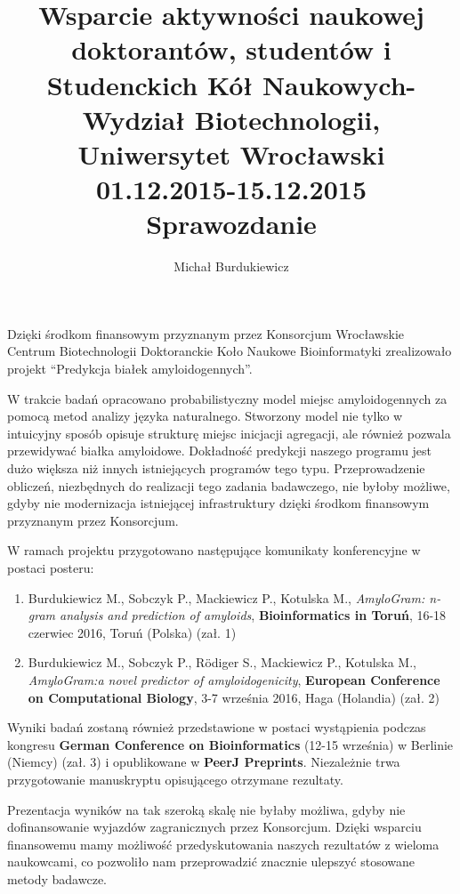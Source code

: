 \documentclass[12pt]{article}
\author{Michał Burdukiewicz}
\title{\large Wsparcie aktywności naukowej doktorantów, studentów i Studenckich 
Kół Naukowych- Wydział Biotechnologii, Uniwersytet Wrocławski 
\\ 
01.12.2015-15.12.2015 \\ 
\normalsize Sprawozdanie}
\date{}
\begin{document}
\maketitle

Dzięki środkom finansowym przyznanym przez Konsorcjum Wrocławskie Centrum 
Biotechnologii Doktoranckie Koło Naukowe Bioinformatyki  
zrealizowało projekt ``Predykcja białek amyloidogennych''.

W trakcie badań opracowano probabilistyczny model miejsc amyloidogennych za 
pomocą metod analizy języka naturalnego. Stworzony model nie tylko w 
intuicyjny sposób opisuje strukturę miejsc inicjacji agregacji, ale również 
pozwala przewidywać białka amyloidowe. Dokładność predykcji naszego programu 
jest dużo większa niż innych istniejących programów tego typu. Przeprowadzenie 
obliczeń, niezbędnych do realizacji tego zadania badawczego, nie byłoby 
możliwe, gdyby nie modernizacja istniejącej infrastruktury dzięki środkom 
finansowym przyznanym przez Konsorcjum.

W ramach projektu przygotowano następujące komunikaty konferencyjne w postaci 
posteru:
\begin{enumerate} 
\item Burdukiewicz M., Sobczyk P., Mackiewicz P., Kotulska M., 
\textit{AmyloGram: n-gram analysis and prediction of amyloids}, 
\textbf{Bioinformatics in Toruń}, 16-18 czerwiec 2016, Toruń (Polska) (zał. 1)

\item Burdukiewicz M., Sobczyk P., Rödiger S., Mackiewicz P., Kotulska M., 
\textit{AmyloGram:a novel predictor of amyloidogenicity}, 
\textbf{European Conference on Computational Biology}, 3-7 września 2016, 
Haga (Holandia) (zał. 2)
\end{enumerate}

Wyniki badań zostaną również przedstawione w postaci wystąpienia podczas 
kongresu \textbf{German Conference on Bioinformatics} (12-15 września) w 
Berlinie (Niemcy) (zał. 3) i opublikowane w \textbf{PeerJ Preprints}. 
Niezależnie trwa przygotowanie manuskryptu opisującego otrzymane 
rezultaty.

Prezentacja wyników na tak szeroką skalę nie byłaby możliwa, gdyby nie 
dofinansowanie wyjazdów zagranicznych przez Konsorcjum. Dzięki wsparciu 
finansowemu mamy możliwość przedyskutowania naszych rezultatów z wieloma 
naukowcami, co pozwoliło nam przeprowadzić znacznie ulepszyć stosowane metody 
badawcze.

\clearpage
\end{document}
